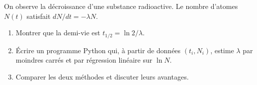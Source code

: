 \begin{exercice}
On observe la d\'ecroissance d'une substance radioactive.  Le nombre
d'atomes $N(t)$ satisfait $dN/dt = -\lambda N$.
\begin{enumerate}
  \item Montrer que la demi-vie est $t_{1/2}=\ln 2/\lambda$.
  \item \'Ecrire un programme Python qui, \`a partir de donn\'ees
    $(t_i,N_i)$, estime $\lambda$ par moindres carr\'es et
    par r\'egression lin\'eaire sur $\ln N$.
  \item Comparer les deux m\'ethodes et discuter leurs avantages.
\end{enumerate}
\end{exercice}
